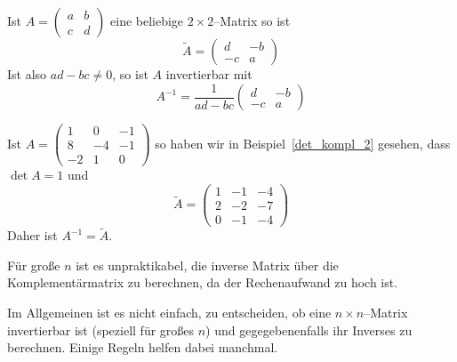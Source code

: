 \begin{beispiel} Ist 
  	$ A = \left( \begin{matrix} a & b \\ c & d \end{matrix} \right) $
eine beliebige $2 \times 2$--Matrix so ist
  	$$ \widetilde{A} = \left( \begin{matrix} d & -b \\ -c & a \end{matrix} \right) $$
Ist also $ad - bc \neq 0$, so ist $A$ invertierbar mit
  	$$ A^{-1} = \frac {1}{ad - bc} \left( \begin{matrix} d & -b \\ -c & a  \end{matrix} \right) $$
\end{beispiel} 
  
\begin{beispiel} Ist 
  	$ A = \left( \begin{matrix} 1 & 0 & -1 \\ 8 & -4 & -1 \\ -2 & 1 & 0 \end{matrix} \right) $
so haben wir in Beispiel~\ref{det_kompl_2} gesehen, dass $\det{A} = 1$ und
  	$$ \widetilde{A} = \left( \begin{matrix} 1 & -1 & -4 \\ 2 & -2 & -7 \\ 0 & -1 & -4 \end{matrix} \right) $$
Daher ist $A^{-1} = \widetilde{A}$.
\end{beispiel}

\medbreak

\begin{notiz} Für große $n$ ist es unpraktikabel, die inverse Matrix über 
die Komplementärmatrix zu berechnen, da der Rechenaufwand zu hoch ist.
\end{notiz}

\bigbreak

Im Allgemeinen ist es nicht einfach, zu entscheiden, ob eine $n \times n$--Matrix invertierbar ist 
(speziell für großes $n$) und gegegebenenfalls ihr Inverses 
zu berechnen. Einige Regeln helfen dabei manchmal.

